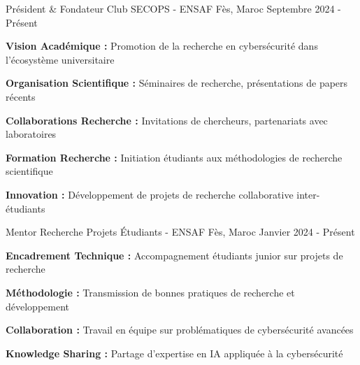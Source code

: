 
\begin{cventries}

    \cventry
    {Président \& Fondateur}
    {Club SECOPS - ENSAF} %
    {Fès, Maroc} %
    {Septembre 2024 - Présent} %
    {
        \begin{cvitems} %
            \item {\textbf{Vision Académique :} Promotion de la recherche en cybersécurité dans l'écosystème universitaire}
            \item {\textbf{Organisation Scientifique :} Séminaires de recherche, présentations de papers récents}
            \item {\textbf{Collaborations Recherche :} Invitations de chercheurs, partenariats avec laboratoires}
            \item {\textbf{Formation Recherche :} Initiation étudiants aux méthodologies de recherche scientifique}
            \item {\textbf{Innovation :} Développement de projets de recherche collaborative inter-étudiants}
        \end{cvitems}
    }

    \cventry
    {Mentor Recherche}
    {Projets Étudiants - ENSAF} %
    {Fès, Maroc} %
    {Janvier 2024 - Présent} %
    {
        \begin{cvitems} %
            \item {\textbf{Encadrement Technique :} Accompagnement étudiants junior sur projets de recherche}
            \item {\textbf{Méthodologie :} Transmission de bonnes pratiques de recherche et développement}
            \item {\textbf{Collaboration :} Travail en équipe sur problématiques de cybersécurité avancées}
            \item {\textbf{Knowledge Sharing :} Partage d'expertise en IA appliquée à la cybersécurité}
        \end{cvitems}
    }


\end{cventries}
